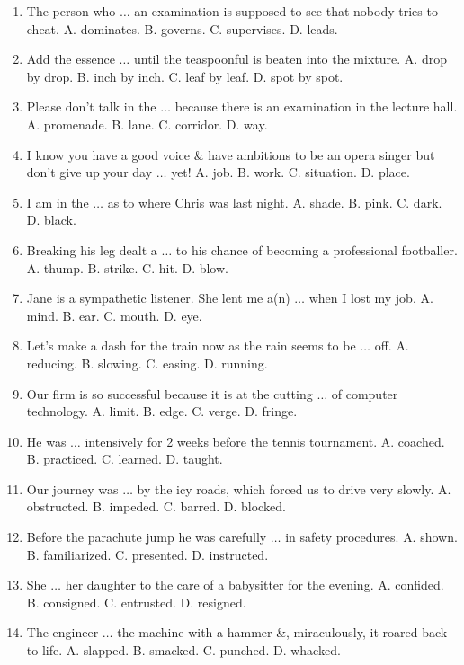 \documentclass{article}
\numberwithin{equation}{section}
\begin{document}
\begin{enumerate}[leftmargin=2mm]
	\item The person who $\ldots$ an examination is supposed to see that nobody tries to cheat. {\sf A.} dominates. {\sf B.} governs. {\sf C.} supervises. {\sf D.} leads.
	\item Add the essence $\ldots$ until the teaspoonful is beaten into the mixture. {\sf A.} drop by drop. {\sf B.} inch by inch. {\sf C.} leaf by leaf. {\sf D.} spot by spot.
	\item Please don't talk in the $\ldots$ because there is an examination in the lecture hall. {\sf A.} promenade. {\sf B.} lane. {\sf C.} corridor. {\sf D.} way.
	\item I know you have a good voice \& have ambitions to be an opera singer but don't give up your day $\ldots$ yet! {\sf A.} job. {\sf B.} work. {\sf C.} situation. {\sf D.} place.
	\item I am in the $\ldots$ as to where Chris was last night. {\sf A.} shade. {\sf B.} pink. {\sf C.} dark. {\sf D.} black.
	\item Breaking his leg dealt a $\ldots$ to his chance of becoming a professional footballer. {\sf A.} thump. {\sf B.} strike. {\sf C.} hit. {\sf D.} blow.
	\item Jane is a sympathetic listener. She lent me a(n) $\ldots$ when I lost my job. {\sf A.} mind. {\sf B.} ear. {\sf C.} mouth. {\sf D.} eye.
	\item Let's make a dash for the train now as the rain seems to be $\ldots$ off. {\sf A.} reducing. {\sf B.} slowing. {\sf C.} easing. {\sf D.} running.
	\item Our firm is so successful because it is at the cutting $\ldots$ of computer technology. {\sf A.} limit. {\sf B.} edge. {\sf C.} verge. {\sf D.} fringe.
	\item He was $\ldots$ intensively for 2 weeks before the tennis tournament. {\sf A.} coached. {\sf B.} practiced. {\sf C.} learned. {\sf D.} taught.
	\item Our journey was $\ldots$ by the icy roads, which forced us to drive very slowly. {\sf A.} obstructed. {\sf B.} impeded. {\sf C.} barred. {\sf D.} blocked.
	\item Before the parachute jump he was carefully $\ldots$ in safety procedures. {\sf A.} shown. {\sf B.} familiarized. {\sf C.} presented. {\sf D.} instructed.
	\item She $\ldots$ her daughter to the care of a babysitter for the evening. {\sf A.} confided. {\sf B.} consigned. {\sf C.} entrusted. {\sf D.} resigned.
	\item The engineer $\ldots$ the machine with a hammer \&, miraculously, it roared back to life. {\sf A.} slapped. {\sf B.} smacked. {\sf C.} punched. {\sf D.} whacked.

\end{enumerate}
\end{document}
